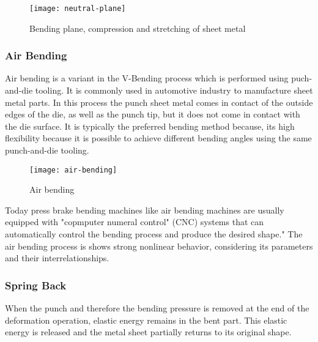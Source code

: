 \begin{figure}[H]
    \centering
    \texttt{[image: neutral-plane]}
    \caption{Bending plane, compression and stretching of sheet metal \cite[p. 3]{baig_machinelearningprediction_2021}}
    \label{fig:neutral-plane}
\end{figure}

\subsubsection{Air Bending}
Air bending is a variant in the V-Bending process which is performed using puch-and-die tooling. \cite[p. 416]{groover_fundamentalsmodernmanufacturing_2020} 
It is commonly used in automotive industry to manufacture sheet metal parts. \cite{kim_predictionbendallowance_2007}
In this process the punch sheet metal comes in contact of the outside edges of the die, as well as the punch tip, but it does not come in contact with the die surface. 
It is typically the preferred bending method because, its high flexibility because it is possible to achieve different bending angles using the same punch-and-die tooling.
\cite[p. 3]{miranda_formingspringbackprediction_2018}\cite[p. 1]{cruz_applicationmachinelearning_2021} 

\begin{figure}[H]
    \centering
    \texttt{[image: air-bending]}
    \caption{Air bending \cite[p. 416]{groover_fundamentalsmodernmanufacturing_2020}}
    \label{fig:air-bending}
\end{figure}

Today press brake bending machines like air bending machines are usually equipped with "copmputer numeral control" (CNC) systems that can automatically control the bending process and produce the desired shape." \cite[p. 3]{miranda_formingspringbackprediction_2018}
The air bending process is shows strong nonlinear behavior, considering its parameters and their interrelationships. \cite[p. 3]{miranda_formingspringbackprediction_2018}

\subsubsection{Spring Back} 
When the punch and therefore the bending pressure is removed at the end of the deformation operation, elastic energy remains in the bent part. This elastic energy is released and the metal sheet partially returns to its original shape. \cite[p. 113-114]{groover_fundamentalsmodernmanufacturing_2020} 

